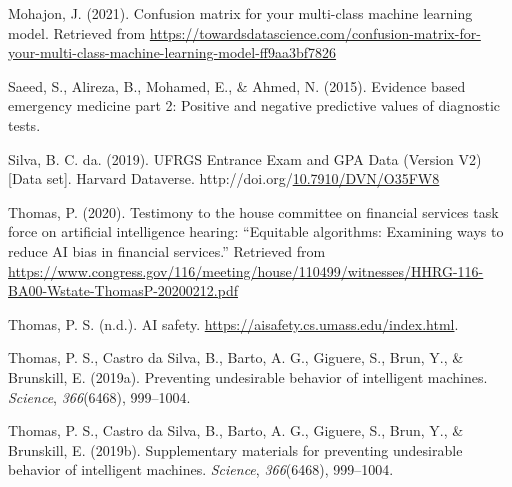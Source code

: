 \documentclass[12pt, twoside]{amherstthesis}
\newenvironment{CSLReferences}[2]%
  {}%
  {\par}
\begin{document}
\begin{CSLReferences}{1}{0}
\leavevmode{}%
Mohajon, J. (2021). Confusion matrix for your multi-class machine learning model. Retrieved from \url{https://towardsdatascience.com/confusion-matrix-for-your-multi-class-machine-learning-model-ff9aa3bf7826}

\leavevmode{}%
Saeed, S., Alireza, B., Mohamed, E., \& Ahmed, N. (2015). Evidence based emergency medicine part 2: Positive and negative predictive values of diagnostic tests.

\leavevmode{}%
Silva, B. C. da. (2019). {UFRGS Entrance Exam and GPA Data} (Version V2) {[}Data set{]}. Harvard Dataverse. http://doi.org/\href{https://doi.org/10.7910/DVN/O35FW8}{10.7910/DVN/O35FW8}

\leavevmode{}%
Thomas, P. (2020). Testimony to the house committee on financial services task force on artificial intelligence hearing: {``Equitable algorithms: Examining ways to reduce AI bias in financial services.''} Retrieved from \url{https://www.congress.gov/116/meeting/house/110499/witnesses/HHRG-116-BA00-Wstate-ThomasP-20200212.pdf}

\leavevmode{}%
Thomas, P. S. (n.d.). AI safety. \url{https://aisafety.cs.umass.edu/index.html}.

\leavevmode{}%
Thomas, P. S., Castro da Silva, B., Barto, A. G., Giguere, S., Brun, Y., \& Brunskill, E. (2019a). Preventing undesirable behavior of intelligent machines. \emph{Science}, \emph{366}(6468), 999--1004.

\leavevmode{}%
Thomas, P. S., Castro da Silva, B., Barto, A. G., Giguere, S., Brun, Y., \& Brunskill, E. (2019b). Supplementary materials for preventing undesirable behavior of intelligent machines. \emph{Science}, \emph{366}(6468), 999--1004.

\end{CSLReferences}
\end{document}
